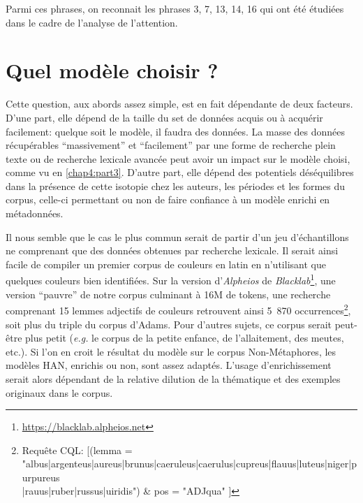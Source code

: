 Parmi ces phrases, on reconnait les phrases 3, 7, 13, 14, 16 qui ont été étudiées dans le cadre de l'analyse de l'attention.




\section{Quel modèle choisir ?}

Cette question, aux abords assez simple, est en fait dépendante de deux facteurs. D'une part, elle dépend de la taille du set de données acquis ou à acquérir facilement: quelque soit le modèle, il faudra des données. La masse des données récupérables ``massivement'' et ``facilement'' par une forme de recherche plein texte ou de recherche lexicale avancée peut avoir un impact sur le modèle choisi, comme vu en \ref{chap4:part3}. D'autre part, elle dépend des potentiels déséquilibres dans la présence de cette isotopie chez les auteurs, les périodes et les formes du corpus, celle-ci permettant ou non de faire confiance à un modèle enrichi en métadonnées.

Il nous semble que le cas le plus commun serait de partir d'un jeu d'échantillons ne comprenant que des données obtenues par recherche lexicale. Il serait ainsi facile de compiler un premier corpus de couleurs en latin en n'utilisant que quelques couleurs bien identifiées. Sur la version d'\textit{Alpheios} de \textit{Blacklab}\footnote{\url{https://blacklab.alpheios.net}}, une version ``pauvre'' de notre corpus culminant à 16M de tokens, une recherche comprenant 15 lemmes adjectifs de couleurs retrouvent ainsi 5~870 occurrences\footnote{Requête CQL: {[(lemma = "albus|argenteus|aureus|brunus|caeruleus|caerulus|cupreus|flauus|luteus|niger|purpureus\\|rauus|ruber|russus|uiridis") \& pos = "ADJqua" ]}}, soit plus du triple du corpus d'Adams. Pour d'autres sujets, ce corpus serait peut-être plus petit (\textit{e.g.} le corpus de la petite enfance, de l'allaitement, des meutes, etc.). Si l'on en croit le résultat du modèle sur le corpus Non-Métaphores, les modèles HAN, enrichis ou non, sont assez adaptés. L'usage d'enrichissement serait alors dépendant de la relative dilution de la thématique et des exemples originaux dans le corpus.

